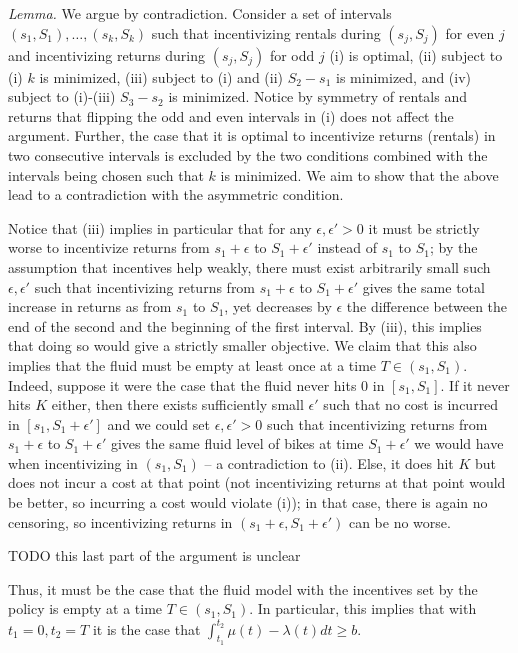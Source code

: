 \emph{Lemma.}
We argue by contradiction. Consider a set of intervals $(s_1,S_1),\ldots,(s_k,S_k)$ such that incentivizing rentals during $(s_j,S_j)$ for even $j$ and incentivizing returns during $(s_j,S_j)$ for odd $j$ (i) is  optimal, (ii) subject to (i) $k$ is minimized, (iii) subject to (i) and (ii) $S_2-s_1$ is minimized, and (iv) subject to (i)-(iii) $S_3-s_2$ is minimized. Notice by symmetry of rentals and returns that flipping the odd and even intervals in (i) does not affect the argument. Further, the case that it is optimal to incentivize returns (rentals) in two consecutive intervals is excluded by the two conditions combined with the intervals being chosen such that $k$ is minimized. We aim to show that the above lead to a contradiction with the asymmetric condition.

Notice that (iii) implies in particular that for any $\epsilon, \epsilon'>0$ it must be strictly worse to incentivize returns from $s_1+\epsilon$ to $S_1+\epsilon'$ instead of $s_1$ to $S_1$; by the assumption that incentives help weakly, there must exist arbitrarily small such $\epsilon,\epsilon'$ such that incentivizing returns from $s_1+\epsilon$ to $S_1+\epsilon'$ gives the same total increase in returns as from $s_1$ to $S_1$, yet decreases by $\epsilon$ the difference between the end of the second and the beginning of the first interval. By (iii), this implies that doing so would give a strictly smaller objective. We claim that this also implies that the fluid must be empty at least once at a time $T\in(s_1,S_1)$. Indeed, suppose it were the case that the fluid never hits 0 in $[s_1,S_1]$. If it never hits $K$ either, then there  exists sufficiently small $\epsilon'$ such that no cost is incurred in $[s_1,S_1+\epsilon']$ and we could set  $\epsilon,\epsilon'>0$ such that incentivizing returns from $s_1+\epsilon$ to $S_1+\epsilon'$ gives the same fluid level of bikes at time $S_1+\epsilon'$ we would have when incentivizing in $(s_1,S_1)$ -- a contradiction to (ii). Else, it does hit $K$ but does not incur a cost at that point (not incentivizing returns at that point would be better, so incurring a cost would violate (i)); in that case, there is again no censoring, so incentivizing returns in $(s_1+\epsilon,S_1+\epsilon')$ can be no worse. 

TODO this last part of the argument is unclear

Thus, it must be the case that the fluid model with the incentives set by the policy is empty at a time $T\in(s_1,S_1)$. In particular, this implies that with $t_1=0, t_2=T$ it is the case that $\int_{t_1}^{t_2} \mu(t)-\lambda(t)dt\geq b$.

